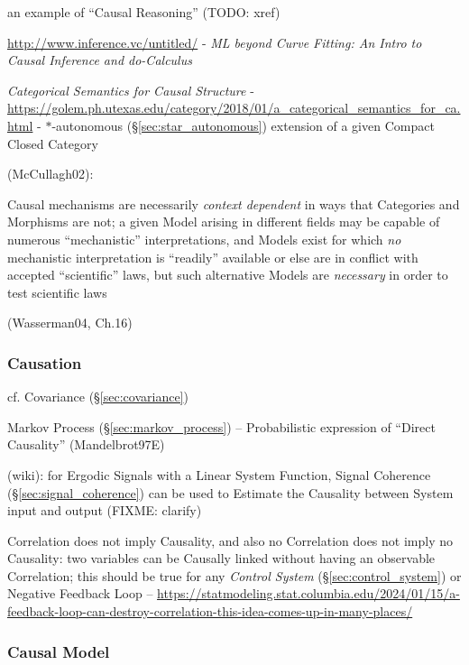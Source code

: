 an example of ``Causal Reasoning'' (TODO: xref)

\url{http://www.inference.vc/untitled/} - \emph{ML beyond Curve Fitting: An
  Intro to Causal Inference and do-Calculus}

\emph{Categorical Semantics for Causal Structure} -
\url{https://golem.ph.utexas.edu/category/2018/01/a_categorical_semantics_for_ca.html}
- $*$-autonomous (\S\ref{sec:star_autonomous}) extension of a given Compact
Closed Category

(McCullagh02):

Causal mechanisms are necessarily \emph{context dependent} in ways that
Categories and Morphisms are not;
a given Model arising in different fields may be capable of numerous
``mechanistic'' interpretations, and Models exist for which \emph{no}
mechanistic interpretation is ``readily'' available or else are in conflict
with accepted ``scientific'' laws, but such alternative Models are
\emph{necessary} in order to test scientific laws

(Wasserman04, Ch.16)



\subsubsection{Causation}\label{sec:causation}


cf. Covariance (\S\ref{sec:covariance})

Markov Process (\S\ref{sec:markov_process}) -- Probabilistic expression of
``Direct Causality'' (Mandelbrot97E)

\fist (wiki): for Ergodic Signals with a Linear System Function, Signal
Coherence (\S\ref{sec:signal_coherence}) can be used to Estimate the Causality
between System input and output (FIXME: clarify)

Correlation does not imply Causality, and also no Correlation does not imply no
Causality: two variables can be Causally linked without having an observable
Correlation; this should be true for any \emph{Control System}
(\S\ref{sec:control_system}) or Negative Feedback Loop --
\url{https://statmodeling.stat.columbia.edu/2024/01/15/a-feedback-loop-can-destroy-correlation-this-idea-comes-up-in-many-places/}



\subsubsection{Causal Model}\label{sec:causal_model}

